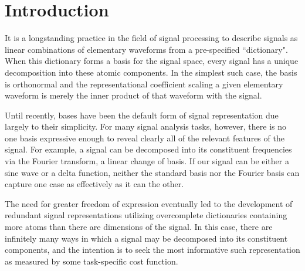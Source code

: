 \chapter{Introduction}\label{Intro}




It is a longstanding practice in the field of signal processing to describe signals as linear combinations of elementary waveforms from a pre-specified ``dictionary". When this dictionary forms a basis for the signal space, every signal has a unique decomposition into these atomic components. In the simplest such case, the basis is orthonormal and the representational coefficient scaling a given elementary waveform is merely the inner product of that waveform with the signal. %

Until recently, bases have been the default form of signal representation due largely to their simplicity. For many signal analysis tasks, however, there is no one basis expressive enough to reveal clearly all of the relevant features of the signal. For example, a signal can be decomposed into its constituent frequencies via the Fourier transform, a linear change of basis. If our signal can be either a sine wave or a delta function, neither the standard basis nor the Fourier basis can capture one case as effectively as it can the other. 

The need for greater freedom of expression eventually led to the development of redundant signal representations utilizing overcomplete dictionaries containing more atoms than there are dimensions of the signal. In this case, there are infinitely many ways in which a signal may be decomposed into its constituent components, and the intention is to seek the most informative such representation as measured by some task-specific cost function. 

